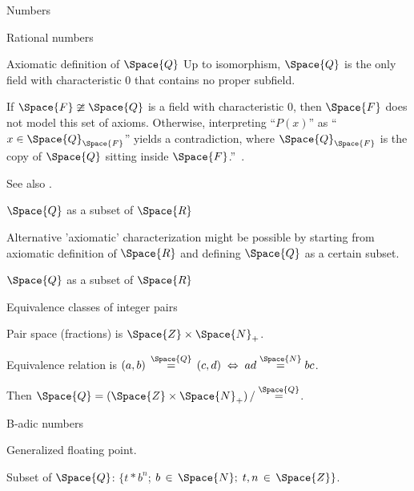 \begin{plSection}{Numbers}
\begin{plSection}{Rational numbers}
\begin{plSection}{Axiomatic definition of \texorpdfstring{$\Space{Q}$}{Q}}
Up to isomorphism, 
$ \Space{Q} $ is the only field with characteristic $ 0 $ 
that contains no proper subfield.

If $ \Space{F} \ncong \Space{Q} $ is 
a field with characteristic $ 0 $, 
then $ \Space{F} $ does not model this set of axioms. 
Otherwise, interpreting “$ P(x) $” as 
“$ x \in \Space{Q}_{\Space{F}} $” yields a contradiction, 
where $ \Space{Q}_{\Space{F}} $ is the copy of $ \Space{Q} $ 
sitting inside 
$ \Space{F} $.''~\cite{HaskellCurry:2012:RationalAxioms}.

See also \cite{Lawrence:2017:Rationals}.

\end{plSection}%
\begin{plSection}{\texorpdfstring{$\Space{Q}$}{Q}
as a subset of 
\texorpdfstring{$\Space{R}$}{R}}
\label{sec:Q_subset_of_R}

Alternative 'axiomatic' characterization
might be possible by starting from axiomatic definition of
$\Space{R}$ and defining $\Space{Q}$ as a certain subset.
\end{plSection}{\texorpdfstring{$\Space{Q}$}{Q} as a subset of \texorpdfstring{$\Space{R}$}{R}}
\begin{plSection}{Equivalence classes of integer pairs}
\label{sec:Equivalence_classes_of_integer_pairs}

Pair space (fractions) is $\Space{Z} \times \Space{N}_{+}$.

Equivalence relation is 
$(a,b) \, \overset{\Space{Q}}{=} \, (c,d) 
\; \Leftrightarrow \; 
ad \overset{\Space{N}}{=} bc$.

Then 
$\Space{Q} = 
(\Space{Z} \times \Space{N}_{+}) 
\, / 
\overset{\Space{Q}}{=}$.

\end{plSection}%
\end{plSection}%
\begin{plSection}{B-adic numbers}
\label{Sec:b_adic_numbers}

Generalized floating point.

Subset of $\Space{Q}$:
$\{t \ast b^n$; $b\,\in\,\Space{N};\; t,n\,\in\,\Space{Z}\}$.


\end{plSection}
\end{plSection}
